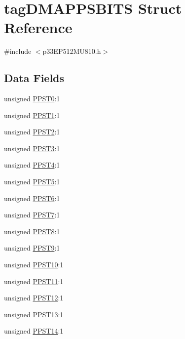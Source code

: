 \hypertarget{structtag_d_m_a_p_p_s_b_i_t_s}{}\section{tag\+D\+M\+A\+P\+P\+S\+B\+I\+TS Struct Reference}
\label{structtag_d_m_a_p_p_s_b_i_t_s}


{\ttfamily \#include $<$p33\+E\+P512\+M\+U810.\+h$>$}

\subsection*{Data Fields}
\begin{DoxyCompactItemize}
\item 
unsigned \hyperlink{structtag_d_m_a_p_p_s_b_i_t_s_aae299822b7620c92a3d75906f76cee52}{P\+P\+S\+T0}\+:1
\item 
unsigned \hyperlink{structtag_d_m_a_p_p_s_b_i_t_s_a3716b700ebd3440adc899278d9b7625a}{P\+P\+S\+T1}\+:1
\item 
unsigned \hyperlink{structtag_d_m_a_p_p_s_b_i_t_s_acb64350921b2fac92cc1e8672db8b2a4}{P\+P\+S\+T2}\+:1
\item 
unsigned \hyperlink{structtag_d_m_a_p_p_s_b_i_t_s_a9db7f0ca39555bf6f18d7cd2029ff91d}{P\+P\+S\+T3}\+:1
\item 
unsigned \hyperlink{structtag_d_m_a_p_p_s_b_i_t_s_a9cd4e46421264bea3fd9767522f7cabe}{P\+P\+S\+T4}\+:1
\item 
unsigned \hyperlink{structtag_d_m_a_p_p_s_b_i_t_s_a755af5b4142d801a03a25c2d5ffb21d3}{P\+P\+S\+T5}\+:1
\item 
unsigned \hyperlink{structtag_d_m_a_p_p_s_b_i_t_s_a2c573790db98b31e1e84de6f74763ed9}{P\+P\+S\+T6}\+:1
\item 
unsigned \hyperlink{structtag_d_m_a_p_p_s_b_i_t_s_a23a8756575eb2218fd62a4ac936803f5}{P\+P\+S\+T7}\+:1
\item 
unsigned \hyperlink{structtag_d_m_a_p_p_s_b_i_t_s_a17abda138409a14ff0c2b47293706acb}{P\+P\+S\+T8}\+:1
\item 
unsigned \hyperlink{structtag_d_m_a_p_p_s_b_i_t_s_a12a16006e5a16be920f34fe125c8ad94}{P\+P\+S\+T9}\+:1
\item 
unsigned \hyperlink{structtag_d_m_a_p_p_s_b_i_t_s_a9b6103574c1b09919e4d559ab27edc60}{P\+P\+S\+T10}\+:1
\item 
unsigned \hyperlink{structtag_d_m_a_p_p_s_b_i_t_s_a66296282bd39aa3a74cdb6b0b1cfd272}{P\+P\+S\+T11}\+:1
\item 
unsigned \hyperlink{structtag_d_m_a_p_p_s_b_i_t_s_ae9eb9eabbb47b828f77d805ebd465acf}{P\+P\+S\+T12}\+:1
\item 
unsigned \hyperlink{structtag_d_m_a_p_p_s_b_i_t_s_acedf512a4dcb19ca6df0e7d9b80bf9f1}{P\+P\+S\+T13}\+:1
\item 
unsigned \hyperlink{structtag_d_m_a_p_p_s_b_i_t_s_ad079842214401e43381922a104266ff7}{P\+P\+S\+T14}\+:1
\end{DoxyCompactItemize}



